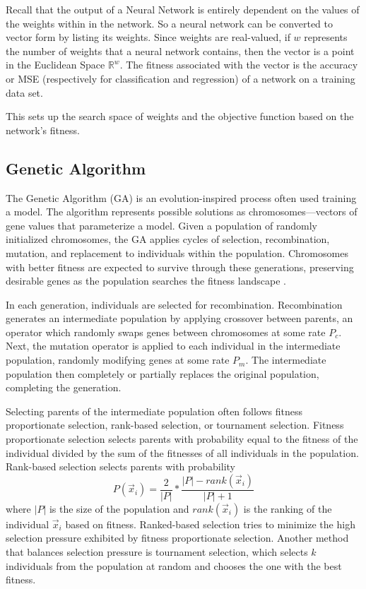 \documentclass[twoside,11pt]{article}
\begin{document}
	Recall that the output of a Neural Network is entirely dependent on the values of the weights within in the network.
	So a neural network can be converted to vector form by listing its weights.
	Since weights are real-valued, if $w$ represents the number of weights that a neural network contains, then the vector is a point in the Euclidean Space $\mathbb{R}^w$.
	The fitness associated with the vector is the accuracy or MSE (respectively for classification and regression) of a network on a training data set.

	This sets up the search space of weights and the objective function based on the network's fitness.

\subsection{Genetic Algorithm}

	The Genetic Algorithm (GA) is an evolution-inspired process often used training a model. 
	The algorithm represents possible solutions as chromosomes---vectors of gene values that parameterize a model. 
	Given a population of randomly initialized chromosomes, the GA applies cycles of selection, recombination, mutation, and replacement to individuals within the population. 
	Chromosomes with better fitness are expected to survive through these generations, preserving desirable genes as the population searches the fitness landscape \citep{ga_tutorial}.

	In each generation, individuals are selected for recombination. 
	Recombination generates an intermediate population by applying crossover between parents, an operator which randomly swaps genes between chromosomes at some rate $P_c$. 
	Next, the mutation operator is applied to each individual in the intermediate population, randomly modifying genes at some rate $P_m$. 
	The intermediate population then completely or partially replaces the original population, completing the generation.

	Selecting parents of the intermediate population often follows fitness proportionate selection, rank-based selection, or tournament selection. 
	Fitness proportionate selection selects parents with probability equal to the fitness of the individual divided by the sum of the fitnesses of all individuals in the population. 
	Rank-based selection selects parents with probability
	$$P(\vec{x}_i) = \frac{2}{|P|} * \frac{|P| - rank(\vec{x}_i)}{|P|+1}$$
	where $|P|$ is the size of the population and $rank(\vec{x}_i)$ is the ranking of the individual $\vec{x}_i$ based on fitness. 
	Ranked-based selection tries to minimize the high selection pressure exhibited by fitness proportionate selection. 
	Another method that balances selection pressure is tournament selection, which selects $k$ individuals from the population at random and chooses the one with the best fitness.
\end{document}
